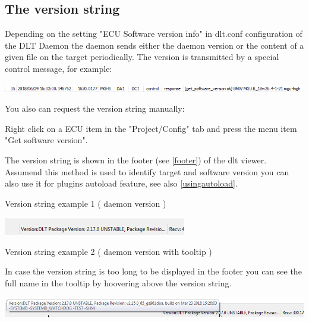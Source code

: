\documentclass[a4paper,11pt]{article}
\begin{document}
\pagebreak
\subsection{The version string}
\label{versionstring}
Depending on the setting "ECU Software version info" in dlt.conf configuration of the DLT Daemon
the daemon sends either the daemon version or the content of a given file on the target periodically.
The version is transmitted by a special control message, for example:

\includegraphics[width=1.0\textwidth]{images/versionstring_message.png}

You also can request the version string manually:

Right click on a ECU item in the "Project/Config" tab and press the menu item "Get software version".


The version string is shown in the footer (see \autoref{footer}) of the dlt viewer.
Assumend this method is used to identify target and software version you can also use it for plugins
autoload feature, see also \autoref{usingautoload}.\linebreak

Version string example 1 ( daemon version )\linebreak

\vspace{0.3cm}

\includegraphics[width=0.6\textwidth]{images/versionstring_daemon.png}

\vspace{0.5cm}

Version string example 2 ( daemon version with tooltip )\linebreak

In case the version string is too long to be displayed in the footer you can see the full name in the tooltip by hoovering above the version string.\\

\vspace{0.2cm}

\includegraphics[width=1.0\textwidth]{images/versionstringwithtooltip.png}
\end{document}
